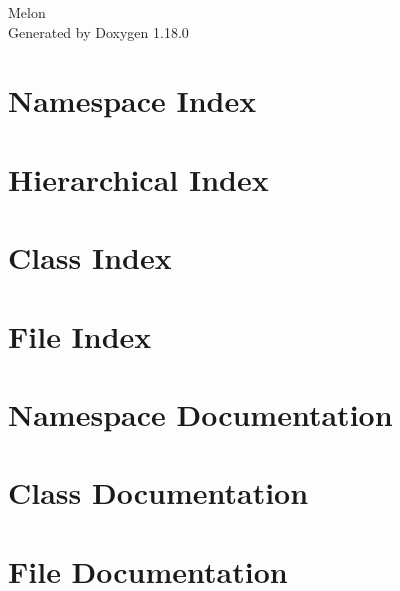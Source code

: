 \documentclass[twoside]{book}
\newcommand{\+}{\discretionary{\mbox{\scriptsize$\hookleftarrow$}}{}{}}
\newcommand{\clearemptydoublepage}{%
    \newpage{\pagestyle{empty}\cleardoublepage}%
  }
\begin{document}
  \raggedbottom
    \hypersetup{pageanchor=false,
                bookmarksnumbered=true,
                pdfencoding=unicode
               }
  \begin{titlepage}
  \vspace*{7cm}
  \begin{center}%
  {\Large Melon}\\
  \vspace*{1cm}
  {\large Generated by Doxygen 1.18.0}\\
  \end{center}
  \end{titlepage}
  \clearemptydoublepage
  \tableofcontents
  \clearemptydoublepage
  \hypersetup{pageanchor=true}
\chapter{Namespace Index}

\chapter{Hierarchical Index}

\chapter{Class Index}

\chapter{File Index}

\chapter{Namespace Documentation}



\chapter{Class Documentation}


\chapter{File Documentation}



  \backmatter
  \newpage
  \clearemptydoublepage
  \printindex
\end{document}
